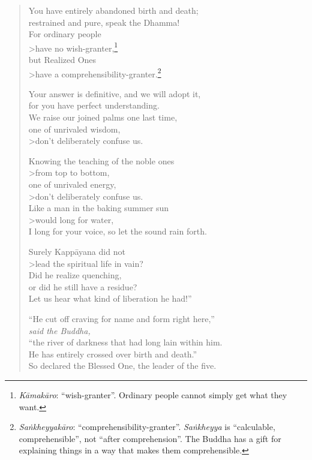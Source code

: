 \documentclass[12pt,openany]{book}%
\newcommand*{\scspeaker}[1]{\hspace{2em}\textit{#1}}
\begin{document}
\begin{verse}
You have entirely abandoned birth and death; \\
restrained and pure, speak the Dhamma! \\
For ordinary people \\>have no wish-granter,\footnote{\textit{\textsanskrit{Kāmakāro}}: “wish-granter”. Ordinary people cannot simply get what they want. } \\
but Realized Ones \\>have a comprehensibility-granter.\footnote{\textit{\textsanskrit{Saṅkheyyakāro}}: “comprehensibility-granter”. \textit{\textsanskrit{Saṅkheyya}} is “calculable, comprehensible”, not “after comprehension”. The Buddha has a gift for explaining things in a way that makes them comprehensible. } 

Your answer is definitive, and we will adopt it, \\
for you have perfect understanding. \\
We raise our joined palms one last time, \\
one of unrivaled wisdom, \\>don’t deliberately confuse us. 

Knowing the teaching of the noble ones \\>from top to bottom, \\
one of unrivaled energy, \\>don’t deliberately confuse us. \\
Like a man in the baking summer sun \\>would long for water, \\
I long for your voice, so let the sound rain forth. 

Surely \textsanskrit{Kappāyana} did not \\>lead the spiritual life in vain? \\
Did he realize quenching, \\
or did he still have a residue? \\
Let us hear what kind of liberation he had!” 

“He cut off craving for name and form right here,” \\
\scspeaker{said the Buddha, }\\
“the river of darkness that had long lain within him. \\
He has entirely crossed over birth and death.” \\
So declared the Blessed One, the leader of the five. 


\end{verse}
\end{document}
